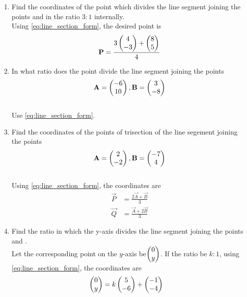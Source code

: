\documentclass[journal,12pt,twocolumn]{IEEEtran}
\renewcommand\thesection{\arabic{section}}
\begin{document}
\begin{enumerate}[label=\thesection.\arabic*.,ref=\thesection.\theenumi]
\item Find the coordinates of the point which divides the line segment joining the points  and  in the ratio $3:1$ internally.
\\
\solution Using \eqref{eq:line_section_form},
the desired point is 
\begin{align}
\mathbf{P} = \frac{3 \begin{pmatrix}4\\-3\end{pmatrix} + \begin{pmatrix}8\\5\end{pmatrix}}{4}
\end{align}
\item In what ratio does the point  divide the line segment joining the points 
%
\begin{align}
\mathbf{A} = \begin{pmatrix}-6\\10\end{pmatrix},
\mathbf{B} = \begin{pmatrix}3\\-8\end{pmatrix}
\end{align}
%
\\
\solution Use \eqref{eq:line_section_form}.
\item Find the coordinates of the points of trisection of the line segement joining the points
%
\begin{align}
\mathbf{A} = \begin{pmatrix}2\\-2\end{pmatrix},
\mathbf{B} = \begin{pmatrix}-7\\4\end{pmatrix}
\end{align}
%
\\
\solution Using \eqref{eq:line_section_form}, the coordinates are
%
\begin{align}
\label{eq:line_section_form_tri}
\vec{P} &= \frac{2 \vec{A} + \vec{B}}{3}
\\
\vec{Q} &= \frac{ \vec{A} + 2\vec{B}}{3}
\end{align}
%
\item Find the ratio in which the y-axis divides the line segment joining the points  and .
\\
\solution Let the corresponding point on the $y$-axis be$\begin{pmatrix}0\\y\end{pmatrix}$. If the ratio be $k:1$,
using \eqref{eq:line_section_form}, the coordinates are
%
\begin{align}
\myvec{0\\y} &= k\myvec{5\\-6}+ \myvec{-1\\-4}

\end{align}
\end{enumerate}
\end{document}
